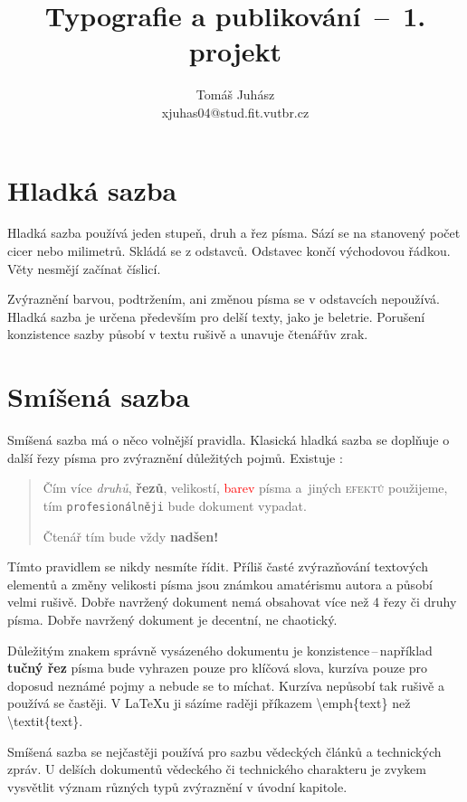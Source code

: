\documentclass[twocolumn]{article}
\title{Typografie a publikování \,--\, 1. projekt}
\author{Tomáš Juhász \\
xjuhas04@stud.fit.vutbr.cz}
\date{}
\begin{document}
\maketitle

\section{Hladká sazba}
Hladká sazba používá jeden stupeň, druh a řez písma.
Sází se na stanovený počet cicer nebo milimetrů.
Skládá se z odstavců. Odstavec končí východovou řádkou.
Věty nesmějí začínat číslicí.

Zvýraznění barvou, podtržením, ani změnou písma se v odstavcích nepoužívá.
Hladká sazba je určena především pro delší texty, jako je beletrie.
Porušení konzistence sazby působí v textu rušivě a unavuje čtenářův zrak.
\section{Smíšená sazba}
Smíšená sazba má o něco volnější pravidla.
Klasická hladká sazba se doplňuje o další řezy písma pro zvýraznění důležitých pojmů.
Existuje :

\begin{quote}

\hspace{0.5cm}Čím více \emph{druhů}, \textbf{řezů}, {\scriptsize{velikostí}}, \textcolor{red}{barev} písma a~jiných \textsc{efektů} použijeme, tím \texttt{profesionálněji} bude {\Large {}\selectfont dokument}  vypadat.
 
{\huge{Č}}{\LARGE{t}}{\Large{e}}{\large{n}}á{\small{ř}} {\footnotesize{t}}{\scriptsize{í}}{\tiny{m}} bude vždy \textbf{\huge{nadšen!}}    
\end{quote}

Tímto pravidlem se nikdy nesmíte řídit.
Příliš časté zvýrazňování textových elementů a změny velikosti písma jsou známkou amatérismu autora a působí velmi rušivě.
Dobře navržený dokument nemá obsahovat více než 4 řezy či druhy písma.
Dobře navržený dokument je decentní, ne chaotický.

Důležitým znakem správně vysázeného dokumentu je konzistence\,--\,například \textbf{tučný řez} písma bude vyhrazen pouze pro klíčová slova, kurzíva pouze pro doposud neznámé pojmy a nebude se to míchat.
Kurzíva nepůsobí tak rušivě a používá se častěji.
V \LaTeX u ji sázíme raději příkazem \textbackslash{emph\{text\}} než \textbackslash{textit\{text\}.}

Smíšená sazba se nejčastěji používá pro sazbu vědeckých článků a technických zpráv.
U delších dokumentů vědeckého či technického charakteru je zvykem vysvětlit význam různých typů zvýraznění v úvodní kapitole.
\end{document}
